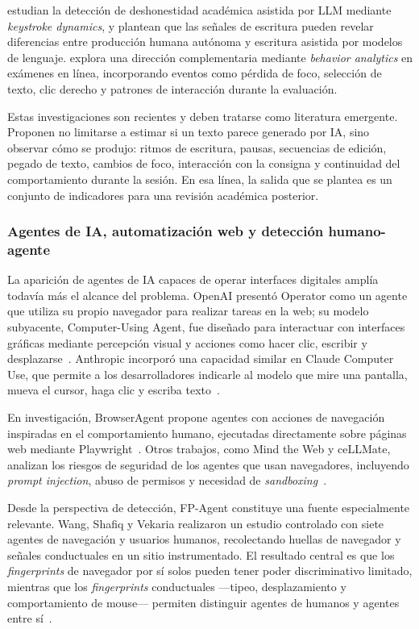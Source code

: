 \textcite{Mehta2025} estudian la detección de deshonestidad académica asistida por LLM mediante \textit{keystroke dynamics}, y plantean que las señales de escritura pueden revelar diferencias entre producción humana autónoma y escritura asistida por modelos de lenguaje. \textcite{Akcapinar2025} explora una dirección complementaria mediante \textit{behavior analytics} en exámenes en línea, incorporando eventos como pérdida de foco, selección de texto, clic derecho y patrones de interacción durante la evaluación.

Estas investigaciones son recientes y deben tratarse como literatura emergente. Proponen no limitarse a estimar si un texto parece generado por IA, sino observar cómo se produjo: ritmos de escritura, pausas, secuencias de edición, pegado de texto, cambios de foco, interacción con la consigna y continuidad del comportamiento durante la sesión. En esa línea, la salida que se plantea es un conjunto de indicadores para una revisión académica posterior.

\subsubsection{Agentes de IA, automatización web y detección humano-agente}
La aparición de agentes de IA capaces de operar interfaces digitales amplía todavía más el alcance del problema. OpenAI presentó Operator como un agente que utiliza su propio navegador para realizar tareas en la web; su modelo subyacente, Computer-Using Agent, fue diseñado para interactuar con interfaces gráficas mediante percepción visual y acciones como hacer clic, escribir y desplazarse~\parencite{OpenAI2025Operator,OpenAI2025CUA}. Anthropic incorporó una capacidad similar en Claude Computer Use, que permite a los desarrolladores indicarle al modelo que mire una pantalla, mueva el cursor, haga clic y escriba texto~\parencite{Anthropic2024CU}.

En investigación, BrowserAgent propone agentes con acciones de navegación inspiradas en el comportamiento humano, ejecutadas directamente sobre páginas web mediante Playwright~\parencite{Zhang2025BrowserAgent}. Otros trabajos, como Mind the Web y ceLLMate, analizan los riesgos de seguridad de los agentes que usan navegadores, incluyendo \textit{prompt injection}, abuso de permisos y necesidad de \textit{sandboxing}~\parencite{Shapira2025MindWeb,Meng2025ceLLMate}.

Desde la perspectiva de detección, FP-Agent constituye una fuente especialmente relevante. Wang, Shafiq y Vekaria realizaron un estudio controlado con siete agentes de navegación y usuarios humanos, recolectando huellas de navegador y señales conductuales en un sitio instrumentado. El resultado central es que los \textit{fingerprints} de navegador por sí solos pueden tener poder discriminativo limitado, mientras que los \textit{fingerprints} conductuales ---tipeo, desplazamiento y comportamiento de mouse--- permiten distinguir agentes de humanos y agentes entre sí~\parencite{Wang2026FPAgent}.

